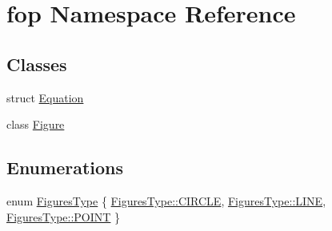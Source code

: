 \hypertarget{namespacefop}{}\section{fop Namespace Reference}
\label{namespacefop}
\subsection*{Classes}
\begin{DoxyCompactItemize}
\item 
struct \mbox{\hyperlink{structfop_1_1_equation}{Equation}}
\item 
class \mbox{\hyperlink{classfop_1_1_figure}{Figure}}
\end{DoxyCompactItemize}
\subsection*{Enumerations}
\begin{DoxyCompactItemize}
\item 
enum \mbox{\hyperlink{namespacefop_a60dafe2e1ac5bb402dad57ecacde23d5}{Figures\+Type}} \{ \mbox{\hyperlink{namespacefop_a60dafe2e1ac5bb402dad57ecacde23d5a0af50777920c1401ab975cab64c4d491}{Figures\+Type\+::\+C\+I\+R\+C\+LE}}, 
\mbox{\hyperlink{namespacefop_a60dafe2e1ac5bb402dad57ecacde23d5a17b8ef2c330f1430e00c9de5469fc7e7}{Figures\+Type\+::\+L\+I\+NE}}, 
\mbox{\hyperlink{namespacefop_a60dafe2e1ac5bb402dad57ecacde23d5aaebdbcb765394d25d6a604589a890f82}{Figures\+Type\+::\+P\+O\+I\+NT}}
 \}
\end{DoxyCompactItemize}
